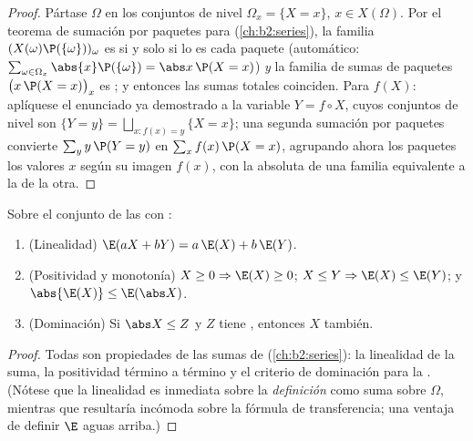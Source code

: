 \begin{proof}
Pártase $\Omega$ en los conjuntos de nivel $\Omega_x = \{X = x\}$, $x
\in X(\Omega)$. Por el teorema de sumación por paquetes para
 (\cref{ch:b2:series}), la familia
$(X(\omega)\P(\{\omega\}))_\omega$ es  si y solo si lo es cada
paquete (automático: $\sum_{\omega \in \Omega_x}\abs{x}\P(\{\omega\})
= \abs x\,\P(X = x)$) \emph{y} la familia de sumas de paquetes
$\bigl(x\,\P(X = x)\bigr)_x$ es ; y entonces las sumas totales
coinciden. Para $f(X)$: aplíquese el enunciado ya demostrado a la
variable $Y = f \circ X$, cuyos conjuntos de nivel son $\{Y = y\} =
\bigsqcup_{x : f(x) = y}\{X = x\}$; una segunda sumación por paquetes
convierte $\sum_y y\,\P(Y = y)$ en $\sum_x f(x)\,\P(X = x)$,
agrupando ahora los paquetes los valores $x$ según su imagen $f(x)$,
con la  absoluta de una familia equivalente a la de la
otra.
\end{proof}

\begin{theorem}\label{thm:b2:randomvar:linearity}
Sobre el conjunto de las  con :
\begin{enumerate}
\item (Linealidad) $\E(aX + bY) = a\,\E(X) + b\,\E(Y)$.
\item (Positividad y monotonía) $X \geq 0 \Rightarrow \E(X) \geq 0$;
$X \leq Y \Rightarrow \E(X) \leq \E(Y)$; y $\abs{\E(X)} \leq
\E(\abs X)$.
\item (Dominación) Si $\abs X \leq Z$ y $Z$ tiene ,
entonces $X$ también.
\end{enumerate}
\end{theorem}

\begin{proof}
Todas son propiedades de las sumas de 
(\cref{ch:b2:series}): la linealidad de la suma, la positividad
término a término y el criterio de dominación para la .
(Nótese que la linealidad es inmediata sobre la \emph{definición}
como suma sobre $\Omega$, mientras que resultaría incómoda sobre la
fórmula de transferencia; una ventaja de definir $\E$ aguas arriba.)
\end{proof}

